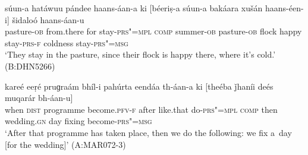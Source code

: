 \begin{exe}
\ex
\label{ex:13-235}
\gll súun-a hatáwuu pándee haans-áan-a ki  [béeriṣ-a súun-a bakáara
  xušán haans-éen-i]  šidaloó haans-áan-u \\
pasture-\textsc{ob} from.there for stay-\textsc{prs"=mpl} \textsc{comp}  summer-\textsc{ob} pasture-\textsc{ob} flock happy stay-\textsc{prs-f} coldness stay-\textsc{prs"=msg} \\
\glt `They stay in the pasture, since their flock is happy there, where it's cold.' (B:DHN5266)

\ex
\label{ex:13-236}
\gll kareé eeṛé pruɡraám bhíl-i pahúrta eendáa  th-áan-a ki [theéba
  ǰhaníi deés muqarár  bh-áan-u] \\
when \textsc{dist} programme become.\textsc{pfv-f} after like.that  do-\textsc{prs"=mpl} \textsc{comp} then wedding.\textsc{gn} day fixing become-\textsc{prs"=msg} \\
\glt `After that programme has taken place, then we do the following: we fix a~day [for the wedding]' (A:MAR072-3)
\end{exe}